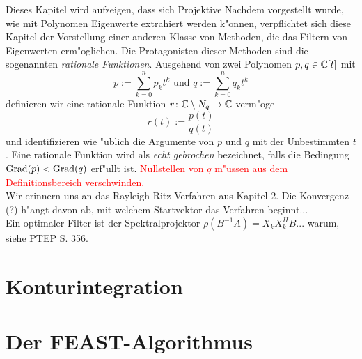 Dieses Kapitel wird aufzeigen, dass sich Projektive
Nachdem vorgestellt wurde, wie mit Polynomen Eigenwerte extrahiert werden k"onnen,
verpflichtet sich diese Kapitel der Vorstellung einer anderen Klasse von Methoden, die
das Filtern von Eigenwerten erm"oglichen. Die Protagonisten dieser Methoden sind
die sogenannten \emph{rationale Funktionen}. Ausgehend
von zwei Polynomen $p, q\in\mathbb{C} [t]$ mit
\[
p := \sum_{k=0}^n p_k t^k \text{ \ und\ } q := \sum_{k=0}^n q_k t^k
\]
definieren wir eine rationale Funktion $r\colon\mathbb{C}\setminus{N_q}\to\mathbb{C}$ verm"oge
\[
r(t) := \frac{p(t)}{q(t)}
\]
und identifizieren wie "ublich die Argumente von $p$ und $q$ mit der Unbestimmten $t$.
Eine rationale Funktion wird als \emph{echt gebrochen} bezeichnet, falls die
Bedingung $\operatorname{Grad}(p) < \operatorname{Grad}(q)$ erf"ullt ist.
\textcolor{red}{Nullstellen von $q$ m"ussen aus dem Definitionsbereich verschwinden.}\\

Wir erinnern uns an das Rayleigh-Ritz-Verfahren aus Kapitel 2. Die Konvergenz (?)
h"angt davon ab, mit welchem Startvektor das Verfahren beginnt...\\

Ein optimaler Filter ist der Spektralprojektor $\rho(B^{-1}A) = X_k X_k^H B$... warum, siehe PTEP S. 356.

\section{Konturintegration}

\section{Der FEAST-Algorithmus}
